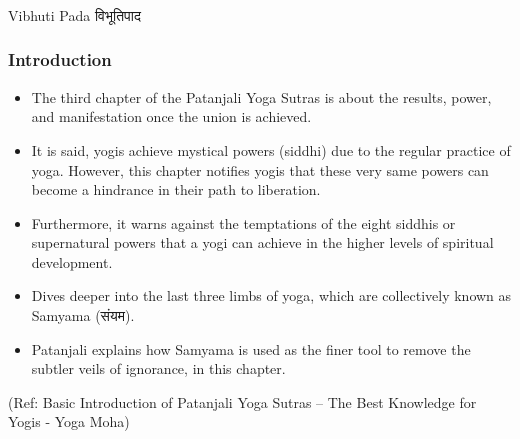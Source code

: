 \begin{frame}[fragile]\frametitle{}
\begin{center}
{\Large Vibhuti Pada विभूतिपाद}
\end{center}
\end{frame}


\begin{frame}[fragile]\frametitle{Introduction}


	\begin{itemize}
	\item The third chapter of the Patanjali Yoga Sutras is about the results, power, and manifestation once the union is achieved. 
		\item It is said, yogis achieve mystical powers (siddhi) due to the regular practice of yoga. However, this chapter notifies yogis that these very same powers can become a hindrance in their path to liberation. 
			\item Furthermore, it warns against the temptations of the eight siddhis or supernatural powers that a yogi can achieve in the higher levels of spiritual development.
	\item Dives deeper into the last three limbs of yoga, which are collectively known as Samyama (संयम).
	\item Patanjali explains how Samyama is used as the finer tool to remove the subtler veils of ignorance, in this chapter.
	\end{itemize}

\tiny{(Ref: Basic Introduction of Patanjali Yoga Sutras – The Best Knowledge for Yogis - Yoga Moha)}

\end{frame}


